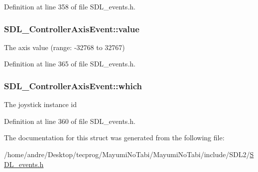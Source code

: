 Definition at line 358 of file S\-D\-L\-\_\-events.\-h.

\hypertarget{struct_s_d_l___controller_axis_event_a1ed7f14255ed01b982d40a38791d475a}{
\subsubsection[{value}]{ S\-D\-L\-\_\-\-Controller\-Axis\-Event\-::value}}\label{struct_s_d_l___controller_axis_event_a1ed7f14255ed01b982d40a38791d475a}
The axis value (range\-: -\/32768 to 32767) 

Definition at line 365 of file S\-D\-L\-\_\-events.\-h.

\hypertarget{struct_s_d_l___controller_axis_event_a07087f68ea9d64b50047d65312ee7b94}{
\subsubsection[{which}]{ S\-D\-L\-\_\-\-Controller\-Axis\-Event\-::which}}\label{struct_s_d_l___controller_axis_event_a07087f68ea9d64b50047d65312ee7b94}
The joystick instance id 

Definition at line 360 of file S\-D\-L\-\_\-events.\-h.



The documentation for this struct was generated from the following file\-:\begin{DoxyCompactItemize}
\item 
/home/andre/\-Desktop/tecprog/\-Mayumi\-No\-Tabi/\-Mayumi\-No\-Tabi/include/\-S\-D\-L2/\hyperlink{_s_d_l__events_8h}{S\-D\-L\-\_\-events.\-h}\end{DoxyCompactItemize}
